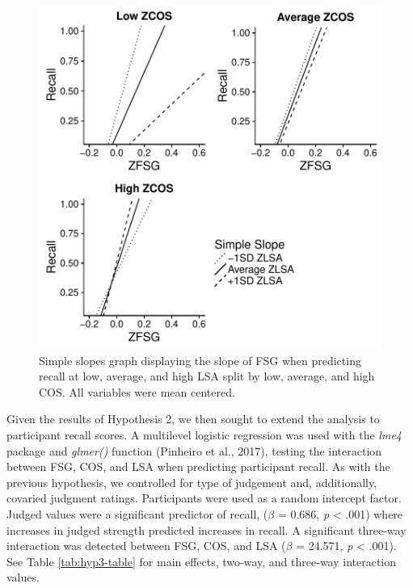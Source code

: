 \documentclass[english,man]{apa6}
\theoremstyle{definition}
\theoremstyle{definition}
\theoremstyle{remark}
\begin{document}
\begin{figure}[htbp]
\centering
\includegraphics{max_buch_JOL_files/figure-latex/hyp3graph-1.pdf}
\caption{\label{fig:hyp3graph}Simple slopes graph displaying the slope of
FSG when predicting recall at low, average, and high LSA split by low,
average, and high COS. All variables were mean centered.}
\end{figure}

Given the results of Hypothesis 2, we then sought to extend the analysis
to participant recall scores. A multilevel logistic regression was used
with the \emph{lme4} package and \emph{glmer()} function (Pinheiro et
al., 2017), testing the interaction between FSG, COS, and LSA when
predicting participant recall. As with the previous hypothesis, we
controlled for type of judgement and, additionally, covaried judgment
ratings. Participants were used as a random intercept factor. Judged
values were a significant predictor of recall, (\(\beta\) = 0.686,
\emph{p} \textless{} .001) where increases in judged strength predicted
increases in recall. A significant three-way interaction was detected
between FSG, COS, and LSA (\(\beta\) = 24.571, \emph{p} \textless{}
.001). See Table \ref{tab:hyp3-table} for main effects, two-way, and
three-way interaction values.
\end{document}
